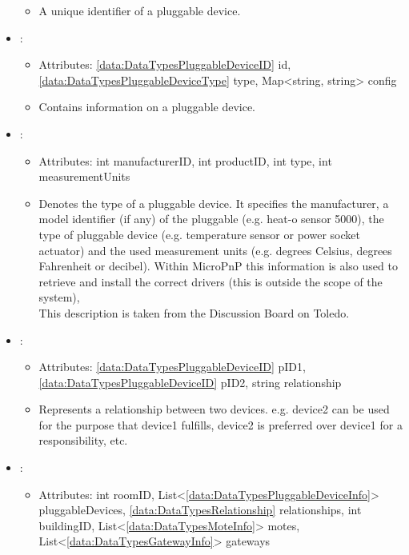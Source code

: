 \begin{itemize}[nolistsep,noitemsep]
\begin{itemize}[noitemsep,nolistsep]
\item[] A unique identifier of a pluggable device.
\end{itemize}
\item {}: 
\begin{itemize}[noitemsep,nolistsep]
\item[] Attributes: \ref{data:DataTypesPluggableDeviceID} id, \ref{data:DataTypesPluggableDeviceType} type, Map\textless{}string, string\textgreater{} config
\item[] Contains information on a pluggable device.
\end{itemize}
\item {}: 
\begin{itemize}[noitemsep,nolistsep]
\item[] Attributes: int manufacturerID, int productID, int type, int measurementUnits
\item[] Denotes the type of a pluggable device. It specifies the manufacturer, a model identifier (if any) of the pluggable (e.g. heat-o sensor 5000), the type of pluggable device (e.g. temperature sensor or power socket actuator) and the used measurement units (e.g. degrees Celsius, degrees Fahrenheit or decibel). Within MicroPnP this information is also used to retrieve and install the correct drivers (this is outside the scope of the system), \\
This description is taken from the Discussion Board on Toledo.
\end{itemize}
\item {}: 
\begin{itemize}[noitemsep,nolistsep]
\item[] Attributes: \ref{data:DataTypesPluggableDeviceID} pID1, \ref{data:DataTypesPluggableDeviceID} pID2, string relationship
\item[] Represents a relationship between two devices. e.g. device2 can be used for the purpose that device1 fulfills, device2 is preferred over device1 for a responsibility, etc.
\end{itemize}
\item {}: 
\begin{itemize}[noitemsep,nolistsep]
\item[] Attributes: int roomID, List\textless{}\ref{data:DataTypesPluggableDeviceInfo}\textgreater{} pluggableDevices, \ref{data:DataTypesRelationship} relationships, int buildingID, List\textless{}\ref{data:DataTypesMoteInfo}\textgreater{} motes, List\textless{}\ref{data:DataTypesGatewayInfo}\textgreater{} gateways

\end{itemize}
\end{itemize}
